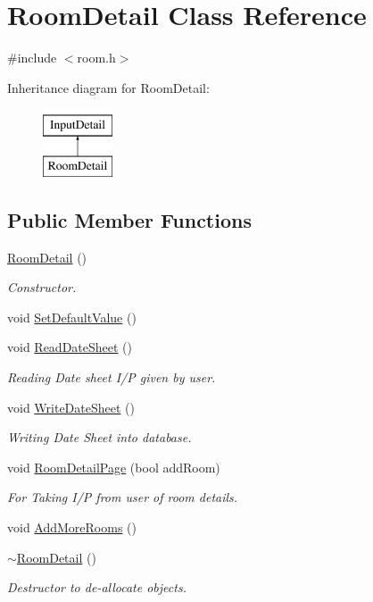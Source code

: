 \hypertarget{classRoomDetail}{\section{\-Room\-Detail \-Class \-Reference}
\label{classRoomDetail}
}


{\ttfamily \#include $<$room.\-h$>$}

\-Inheritance diagram for \-Room\-Detail\-:\begin{figure}[H]
\begin{center}
\leavevmode
\includegraphics[height=2.000000cm]{classRoomDetail}
\end{center}
\end{figure}
\subsection*{\-Public \-Member \-Functions}
\begin{DoxyCompactItemize}
\item 
\hyperlink{classRoomDetail_acbbb21580bc1591daf23e614011acc06}{\-Room\-Detail} ()
\begin{DoxyCompactList}\small\item\em \-Constructor. \end{DoxyCompactList}\item 
void \hyperlink{classRoomDetail_a117bed37b0f95b364b7133fe13afa9b7}{\-Set\-Default\-Value} ()
\item 
void \hyperlink{classRoomDetail_ab8a07fd05ab314e85b374191e38e8556}{\-Read\-Date\-Sheet} ()
\begin{DoxyCompactList}\small\item\em \-Reading \-Date sheet \-I/\-P given by user. \end{DoxyCompactList}\item 
void \hyperlink{classRoomDetail_a90d4fc5bf3497068efecb5c9ec13e887}{\-Write\-Date\-Sheet} ()
\begin{DoxyCompactList}\small\item\em \-Writing \-Date \-Sheet into database. \end{DoxyCompactList}\item 
void \hyperlink{classRoomDetail_ab2c0a691ce4dea82d16f991c66021931}{\-Room\-Detail\-Page} (bool add\-Room)
\begin{DoxyCompactList}\small\item\em \-For \-Taking \-I/\-P from user of room details. \end{DoxyCompactList}\item 
void \hyperlink{classRoomDetail_ac4d4701717acda86a95c68ef5abbab28}{\-Add\-More\-Rooms} ()
\item 
\hyperlink{classRoomDetail_ae65b9b167e75a7dc994c4e2021937c68}{$\sim$\-Room\-Detail} ()
\begin{DoxyCompactList}\small\item\em \-Destructor to de-\/allocate objects. \end{DoxyCompactList}\end{DoxyCompactItemize}
